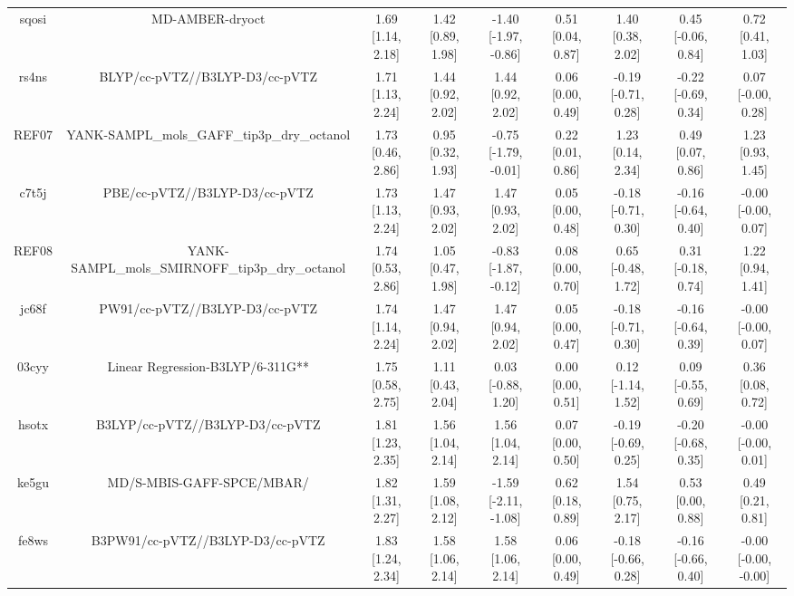 \documentclass{article}
\begin{document}
\begin{center}
\begin{longtable}{|ccccccccc|}
 sqosi &                                    MD-AMBER-dryoct &  1.69 [1.14, 2.18] &  1.42 [0.89, 1.98] &  -1.40 [-1.97, -0.86] &  0.51 [0.04, 0.87] &    1.40 [0.38, 2.02] &   0.45 [-0.06, 0.84] &     0.72 [0.41, 1.03] \\
 rs4ns &                     BLYP/cc-pVTZ//B3LYP-D3/cc-pVTZ &  1.71 [1.13, 2.24] &  1.44 [0.92, 2.02] &     1.44 [0.92, 2.02] &  0.06 [0.00, 0.49] &  -0.19 [-0.71, 0.28] &  -0.22 [-0.69, 0.34] &    0.07 [-0.00, 0.28] \\
 REF07 &        YANK-SAMPL\_mols\_GAFF\_tip3p\_dry\_octanol &  1.73 [0.46, 2.86] &  0.95 [0.32, 1.93] &  -0.75 [-1.79, -0.01] &  0.22 [0.01, 0.86] &    1.23 [0.14, 2.34] &    0.49 [0.07, 0.86] &     1.23 [0.93, 1.45] \\
 c7t5j &                      PBE/cc-pVTZ//B3LYP-D3/cc-pVTZ &  1.73 [1.13, 2.24] &  1.47 [0.93, 2.02] &     1.47 [0.93, 2.02] &  0.05 [0.00, 0.48] &  -0.18 [-0.71, 0.30] &  -0.16 [-0.64, 0.40] &   -0.00 [-0.00, 0.07] \\
 REF08 &    YANK-SAMPL\_mols\_SMIRNOFF\_tip3p\_dry\_octanol &  1.74 [0.53, 2.86] &  1.05 [0.47, 1.98] &  -0.83 [-1.87, -0.12] &  0.08 [0.00, 0.70] &   0.65 [-0.48, 1.72] &   0.31 [-0.18, 0.74] &     1.22 [0.94, 1.41] \\
 jc68f &                     PW91/cc-pVTZ//B3LYP-D3/cc-pVTZ &  1.74 [1.14, 2.24] &  1.47 [0.94, 2.02] &     1.47 [0.94, 2.02] &  0.05 [0.00, 0.47] &  -0.18 [-0.71, 0.30] &  -0.16 [-0.64, 0.39] &   -0.00 [-0.00, 0.07] \\
 03cyy &                   Linear Regression-B3LYP/6-311G** &  1.75 [0.58, 2.75] &  1.11 [0.43, 2.04] &    0.03 [-0.88, 1.20] &  0.00 [0.00, 0.51] &   0.12 [-1.14, 1.52] &   0.09 [-0.55, 0.69] &     0.36 [0.08, 0.72] \\
 hsotx &                    B3LYP/cc-pVTZ//B3LYP-D3/cc-pVTZ &  1.81 [1.23, 2.35] &  1.56 [1.04, 2.14] &     1.56 [1.04, 2.14] &  0.07 [0.00, 0.50] &  -0.19 [-0.69, 0.25] &  -0.20 [-0.68, 0.35] &   -0.00 [-0.00, 0.01] \\
 ke5gu &                          MD/S-MBIS-GAFF-SPCE/MBAR/ &  1.82 [1.31, 2.27] &  1.59 [1.08, 2.12] &  -1.59 [-2.11, -1.08] &  0.62 [0.18, 0.89] &    1.54 [0.75, 2.17] &    0.53 [0.00, 0.88] &     0.49 [0.21, 0.81] \\
 fe8ws &                   B3PW91/cc-pVTZ//B3LYP-D3/cc-pVTZ &  1.83 [1.24, 2.34] &  1.58 [1.06, 2.14] &     1.58 [1.06, 2.14] &  0.06 [0.00, 0.49] &  -0.18 [-0.66, 0.28] &  -0.16 [-0.66, 0.40] &  -0.00 [-0.00, -0.00] \\

\end{longtable}
\end{center}
\end{document}
